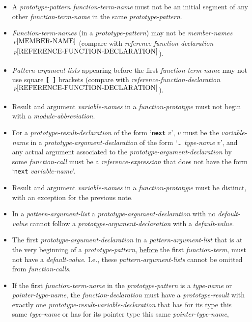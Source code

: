 \documentclass[12pt]{article}
\newcommand{\TT}[1]{{\tt \bfseries #1}}
\newcommand{\pagnote}[1]{$\,^{p\pageref{#1}}$}
\begin{document}
\begin{itemize}\label{FUNCTION-DECLARATION-RULES}
\item
A {\em prototype-pattern} {\em function-term-name} must not be
an initial segment of any other {\em function-term-name}
in the same {\em prototype-pattern}.
\item
{\em Function-term-names} (in a {\em prototype-pattern})
may not be {\em member-names}\pagnote{MEMBER-NAME}
(compare with {\em reference-function-declaration}%
\pagnote{REFERENCE-FUNCTION-DECLARATION}).
\item
{\em Pattern-argument-lists} appearing before the first
{\em function-term-name} may not use square \TT{[~]} brackets
(compare with {\em reference-function-declaration}%
\pagnote{REFERENCE-FUNCTION-DECLARATION}).
\item
Result and argument {\em variable-names}
in a {\em function-prototype} must not begin with a {\em module-abbreviation}.
\item
\label{PROTOTYPE-NEXT-RESULT}
For a {\em prototype-result-declaration} of the form `\TT{next} $v$',
$v$ must be the {\em vari\-able-name} in a {\em prototype-argument-declaration}
of the form `\dots{} {\em type-name} $v$', and
any actual argument associated to the {\em prototype-argument-declaration}
by some {\em function-call}
must be a {\em reference-expression} that
does not have the form `{\tt next} {\em variable-name}'.
\item
Result and argument {\em variable-names}
in a {\em function-prototype} must
be distinct, with an exception for the previous note.
\item
In a {\em pattern-argument-list}
a {\em prototype-argument-declaration} with no {\em de\-fault-value} cannot
follow a {\em prototype-argument-declaration} with a {\em default-value}.
\item
The first {\em prototype-argument-declaration}
in a {\em pattern-argument-list} that is at the very beginning
of a {\em prototype-pattern}, \underline{before} the first
{\em function-term}, must not have a {\em default-value}.
I.e., these {\em pattern-argument-lists} cannot be omitted from
{\em function-calls}.
\item
If the first {\em function-term-name} in the {\em prototype-pattern}
is a {\em type-name} or {\em pointer-type-name},
the {\em function-declaration} must have
a {\em prototype-result} with exactly
one {\em prototype-result-variable-declaration}
that has for its type this same {\em type-name} or has for its pointer type
this same {\em pointer-type-name},

\end{itemize}
\end{document}
